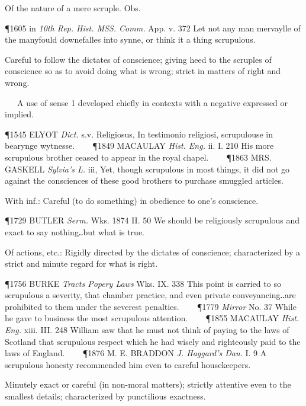 \begin{description}[wide, labelwidth=!, labelindent=0pt]
\begin{myenumerate}
 Of the nature of a mere scruple. Obs.

\P 1605 in  \textit{10th Rep. Hist. MSS. Comm.} App. v. 372 Let not any man mervaylle of the manyfould downefalles into synne, or think it a thing scrupulous.

 Careful to follow the dictates of conscience; giving heed to the scruples of conscience so as to avoid doing what is wrong; strict in matters of right and wrong.

   A use of sense 1 developed chiefly in contexts with a negative expressed or implied.

\P 1545 ELYOT  \textit{Dict.} s.v. Religiosus, In testimonio religiosi, scrupulouse in bearynge wytnesse.    
\P 1849 MACAULAY  \textit{Hist. Eng.} ii. I. 210 His more scrupulous brother ceased to appear in the royal chapel.    
\P 1863 MRS. GASKELL  \textit{Sylvia's L.} iii, Yet, though scrupulous in most things, it did not go against the consciences of these good brothers to purchase smuggled articles.

 With inf.: Careful (to do something) in obedience to one's conscience.

\P 1729 BUTLER \textit{Serm.} Wks. 1874 II. 50 We should be religiously scrupulous and exact to say nothing‥but what is true.

 Of actions, etc.: Rigidly directed by the dictates of conscience; characterized by a strict and minute regard for what is right.

\P 1756 BURKE  \textit{Tracts Popery Laws} Wks. IX. 338 This point is carried to so scrupulous a severity, that chamber practice, and even private conveyancing‥are prohibited to them under the severest penalties.    
\P 1779 \textit{Mirror}  No. 37 While he gave to business the most scrupulous attention.    
\P 1855 MACAULAY  \textit{Hist. Eng.} xiii. III. 248 William saw that he must not think of paying to the laws of Scotland that scrupulous respect which he had wisely and righteously paid to the laws of England.    
\P 1876 M. E. BRADDON  \textit{J. Haggard's Dau.} I. 9 A scrupulous honesty recommended him even to careful housekeepers.

 Minutely exact or careful (in non-moral matters); strictly attentive even to the smallest details; characterized by punctilious exactness.


\end{myenumerate}
\end{description}
